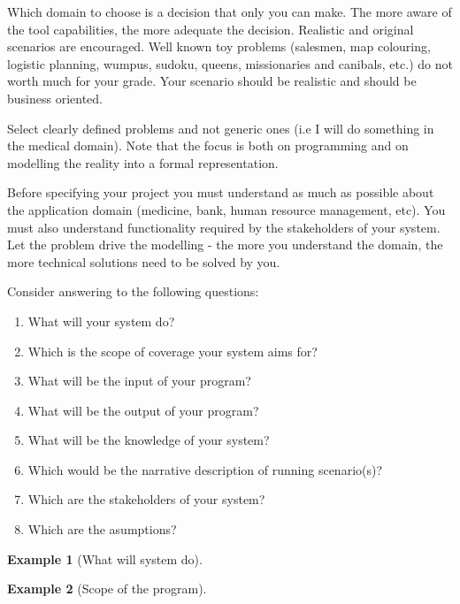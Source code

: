 \documentclass[a4paper,12pt]{report}
\newtheorem{example}{Example}
\begin{document}
Which domain to choose is a decision that only you can make. 
The more aware of the tool capabilities, the more adequate the decision.
Realistic and original scenarios are encouraged. 
Well known toy problems (salesmen, map colouring, logistic planning, wumpus, sudoku, queens, missionaries and canibals, etc.) do not worth much for your grade. 
Your scenario should be realistic and should be business oriented. 

Select clearly defined problems and not generic ones 
(i.e I will do something in the medical domain). 
Note that the focus is both on programming and on modelling the reality into a formal representation.


Before specifying your project you must understand as much as possible about the application domain (medicine, bank, human resource management, etc). 
You must also understand functionality required by the stakeholders of your system. 
Let the problem drive the modelling - the more you understand the domain, the more technical solutions need to be solved by you. 

Consider answering to the following questions:
\begin{enumerate}
 \item What will your system do?
\item Which is the scope of coverage your system aims for?
\item What will be the input of your program?
\item What will be the output of your program?
\item What will be the knowledge of your system?
\item Which would be the narrative description of running scenario(s)?
\item Which are the stakeholders of your system?
\item Which are the asumptions?
\end{enumerate}

\begin{example}[What will system do]
 
\end{example}

\begin{example}[Scope of the program]
 
\end{example}
\end{document}
